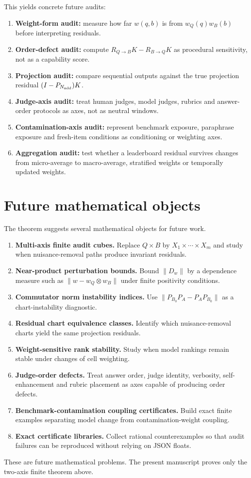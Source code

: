 \documentclass[11pt]{article}
\theoremstyle{remark}
\newcommand{\RQBt}{R_{Q\to B}}
\newcommand{\RBQt}{R_{B\to Q}}
\begin{document}
This yields concrete future audits:
\begin{enumerate}[leftmargin=*,itemsep=2pt]
\item \textbf{Weight-form audit:} measure how far $w(q,b)$ is from $w_Q(q)w_B(b)$ before interpreting residuals.
\item \textbf{Order-defect audit:} compute $\RQBt K-\RBQt K$ as procedural sensitivity, not as a capability score.
\item \textbf{Projection audit:} compare sequential outputs against the true projection residual $(I-P_{N_{\rm add}})K$.
\item \textbf{Judge-axis audit:} treat human judges, model judges, rubrics and answer-order protocols as axes, not as neutral windows.
\item \textbf{Contamination-axis audit:} represent benchmark exposure, paraphrase exposure and fresh-item conditions as conditioning or weighting axes.
\item \textbf{Aggregation audit:} test whether a leaderboard residual survives changes from micro-average to macro-average, stratified weights or temporally updated weights.
\end{enumerate}

\section{Future mathematical objects}

The theorem suggests several mathematical objects for future work.
\begin{enumerate}[leftmargin=*,itemsep=2pt]
\item \textbf{Multi-axis finite audit cubes.} Replace $Q\times B$ by $X_1\times\cdots\times X_m$ and study when nuisance-removal paths produce invariant residuals.
\item \textbf{Near-product perturbation bounds.} Bound $\|D_w\|$ by a dependence measure such as $\|w-w_Q\otimes w_B\|$ under finite positivity conditions.
\item \textbf{Commutator norm instability indices.} Use $\|P_{B_0}P_A-P_AP_{B_0}\|$ as a chart-instability diagnostic.
\item \textbf{Residual chart equivalence classes.} Identify which nuisance-removal charts yield the same projection residuals.
\item \textbf{Weight-sensitive rank stability.} Study when model rankings remain stable under changes of cell weighting.
\item \textbf{Judge-order defects.} Treat answer order, judge identity, verbosity, self-enhancement and rubric placement as axes capable of producing order defects.
\item \textbf{Benchmark-contamination coupling certificates.} Build exact finite examples separating model change from contamination-weight coupling.
\item \textbf{Exact certificate libraries.} Collect rational counterexamples so that audit failures can be reproduced without relying on JSON floats.
\end{enumerate}
These are future mathematical problems. The present manuscript proves only the two-axis finite theorem above.
\end{document}
